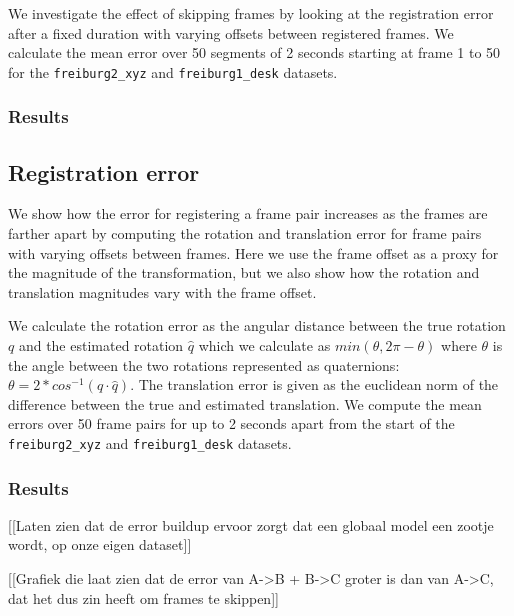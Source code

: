 \documentclass[a4paper]{article}
\begin{document}
We investigate the effect of skipping frames by looking at the registration error after a fixed duration with varying offsets between registered frames. We calculate the mean error over 50 segments of 2 seconds starting at frame 1 to 50 for the \texttt{freiburg2\_xyz} and \texttt{freiburg1\_desk} datasets.

\subsubsection{Results}


\subsection{Registration error}
\label{registration_error}

We show how the error for registering a frame pair increases as the frames are farther apart by computing the rotation and translation error for frame pairs with varying offsets between frames. Here we use the frame offset as a proxy for the magnitude of the transformation, but we also show how the rotation and translation magnitudes vary with the frame offset.

We calculate the rotation error as the angular distance between the true rotation $q$ and the estimated rotation $\hat q$ which we calculate as $min(\theta, 2\pi - \theta)$ where $\theta$ is the angle between the two rotations represented as quaternions: $\theta = 2 * cos^{-1}(q \cdot \hat q)$. %
The translation error is given as the euclidean norm of the difference between the true and estimated translation. We compute the mean errors over 50 frame pairs for up to 2 seconds apart from the start of the \texttt{freiburg2\_xyz} and \texttt{freiburg1\_desk} datasets.

\subsubsection{Results}



[[Laten zien dat de error buildup ervoor zorgt dat een globaal model een zootje wordt, op onze eigen dataset]]

[[Grafiek die laat zien dat de error van A->B + B->C groter is dan van A->C, dat het dus zin heeft om frames te skippen]]
\end{document}
